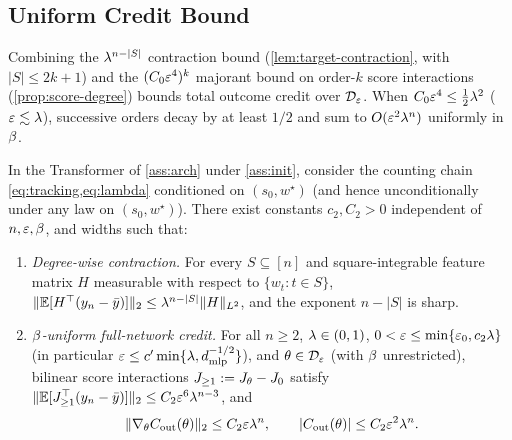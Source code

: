 \subsection{Uniform Credit Bound}
\label{app:thm1}

Combining the $\lambda^{n-|S|}$ contraction bound (\cref{lem:target-contraction}, with $|S| \le 2k + 1$) and the $(C_0\varepsilon^4)^k$ majorant bound on order-$k$ score interactions (\cref{prop:score-degree}) bounds total outcome credit over $\mathcal D_{\varepsilon}$. When $C_0\varepsilon^4 \le \frac{1}{2}\lambda^2$ ($\varepsilon \lesssim \lambda$), successive orders decay by at least $1/2$ and sum to $O(\varepsilon^2\lambda^n)$ uniformly in $\beta$.

\begin{lemma}
\label{thm:main}
\label{lem:score-sum}
\label{lem:bias-uniform}
In the Transformer of \cref{ass:arch} under \cref{ass:init}, consider the counting chain \cref{eq:tracking,eq:lambda} conditioned on $(s_0, w^\star)$ (and hence unconditionally under any law on $(s_0, w^\star)$). There exist constants $c_2, C_2 > 0$ independent of $n, \varepsilon, \beta$, and widths such that:
\begin{enumerate}[label=(\roman*),leftmargin=*,itemsep=1pt,topsep=2pt]
\item \emph{Degree-wise contraction.} For every $S \subseteq [n]$ and square-integrable feature matrix $H$ measurable with respect to $\{w_t : t \in S\}$, $\|\mathbb E[H^\top(y_n - \bar y)]\|_2 \le \lambda^{n-|S|}\|H\|_{L^2}$, and the exponent $n - |S|$ is sharp.
\item \emph{$\beta$-uniform full-network credit.} For all $n \ge 2$, $\lambda \in (0,1)$, $0 < \varepsilon \le \min\{\varepsilon_0, c_2\lambda\}$ (in particular $\varepsilon \le c'\min\{\lambda, d_{\mathrm{mlp}}^{-1/2}\}$), and $\theta \in \mathcal D_{\varepsilon}$ (with $\beta$ unrestricted), bilinear score interactions $J_{\ge 1} := J_\theta - J_0$ satisfy $\|\mathbb E[J_{\ge 1}^\top(y_n - \bar y)]\|_2 \le C_2\varepsilon^6\lambda^{n-3}$, and
\begin{equation}
  \|\nabla_\theta C_{\mathrm{out}}(\theta)\|_2 \le C_2\varepsilon\lambda^n, \qquad \lvert C_{\mathrm{out}}(\theta)\rvert \le C_2\varepsilon^2\lambda^n.
  \label{eq:thm1-full}
\end{equation}
\end{enumerate}
\end{lemma}
